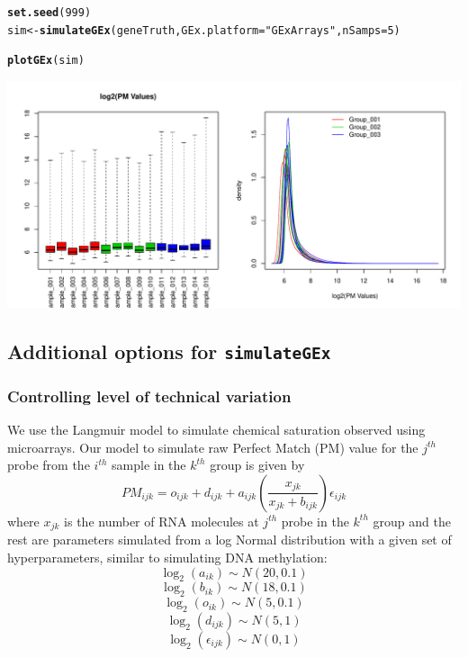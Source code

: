 \documentclass{article}\usepackage[]{graphicx}\usepackage[usenames,dvipsnames]{color}
\makeatletter
\def\maxwidth{ %
  \ifdim\Gin@nat@width>\linewidth
    \linewidth
  \else
    \Gin@nat@width
  \fi
}
\newcommand{\hlnum}[1]{\textcolor[rgb]{0.686,0.059,0.569}{#1}}%
\newcommand{\hlstr}[1]{\textcolor[rgb]{0.192,0.494,0.8}{#1}}%
\newcommand{\hlstd}[1]{\textcolor[rgb]{0.345,0.345,0.345}{#1}}%
\newcommand{\hlkwb}[1]{\textcolor[rgb]{0.69,0.353,0.396}{#1}}%
\newcommand{\hlkwc}[1]{\textcolor[rgb]{0.333,0.667,0.333}{#1}}%
\newcommand{\hlkwd}[1]{\textcolor[rgb]{0.737,0.353,0.396}{\textbf{#1}}}%
\newenvironment{kframe}{%
 \def\at@end@of@kframe{}%
 \ifinner\ifhmode%
  \def\at@end@of@kframe{\end{minipage}}%
  \begin{minipage}{\columnwidth}%
 \fi\fi%
 \def\FrameCommand##1{\hskip\@totalleftmargin \hskip-\fboxsep
 \colorbox{shadecolor}{##1}\hskip-\fboxsep
     \hskip-\linewidth \hskip-\@totalleftmargin \hskip\columnwidth}%
 \MakeFramed {\advance\hsize-\width
   \@totalleftmargin\z@ \linewidth\hsize
   \@setminipage}}%
 {\par\unskip\endMakeFramed%
 \at@end@of@kframe}
\newenvironment{knitrout}{}{} %
\makeatother
\begin{document}
\begin{knitrout}
\color{fgcolor}\begin{kframe}
\begin{alltt}
\hlkwd{set.seed}\hlstd{(}\hlnum{999}\hlstd{)}
\hlstd{sim} \hlkwb{<-} \hlkwd{simulateGEx}\hlstd{(geneTruth,}  \hlkwc{GEx.platform} \hlstd{=} \hlstr{"GExArrays"}\hlstd{,} \hlkwc{nSamps} \hlstd{=} \hlnum{5}\hlstd{)}
\end{alltt}


{\ttfamily\noindent\itshape\color{messagecolor}{\#\# Simulating gene expression samples using the GEx.platform: GExArrays\\\#\# No PCR amplification of RNA transcript counts.}}\begin{alltt}
\hlkwd{plotGEx}\hlstd{(sim)}
\end{alltt}
\end{kframe}
\includegraphics[width=\maxwidth]{figure/gene-figs-3groups-1} 

\end{knitrout}




\subsection{Additional options for \texttt{simulateGEx}}

\subsubsection{Controlling level of technical variation}

We use the Langmuir model to simulate chemical saturation observed using 
microarrays. Our model to simulate raw Perfect Match (PM) value for 
the $j^{th}$ probe from the $i^{th}$ sample in the $k^{th}$ group is given by
\[ PM_{ijk} = o_{ijk} + d_{ijk} + a_{ijk} ( \frac{x_{jk}}{x_{jk} + b_{ijk}} ) 
\epsilon_{ijk}  \]
where $x_{jk}$ is the number of RNA molecules at $j^{th}$ probe in the 
$k^{th}$ group and the rest are parameters simulated from a log Normal 
distribution with a given set of hyperparameters, similar to simulating 
DNA methylation: 
\[ \log_2(a_{ik}) \sim  N(20, 0.1) \]
\[ \log_2(b_{ik}) \sim  N(18, 0.1) \]
\[ \log_2(o_{ik}) \sim  N(5, 0.1) \]
\[ \log_2(d_{ijk}) \sim  N(5, 1) \]
\[ \log_2(\epsilon_{ijk}) \sim  N(0, 1) \]
\end{document}
